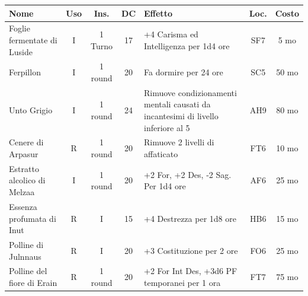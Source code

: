 \noindent\begin{tabularx}{1\textwidth}{lcccXcc}
\textbf{Nome}& \textbf{Uso} & \textbf{Ins.} & \textbf{DC} & \textbf{Effetto}& \textbf{Loc.} & \textbf{Costo} \\
\toprule
Foglie fermentate di Luside\index{Foglie fermentate di Luside}& I& 1 Turno& 17&+4 Carisma ed Intelligenza per 1d4 ore& SF7 & 5 mo\\
\toprule
Ferpillon \index{Ferpillon}& I& 1 round & 20& Fa dormire per 24 ore& SC5 & 50 mo \\
\toprule
Unto Grigio \index{Unto Grigio} & I& 1 round & 24& Rimuove condizionamenti mentali causati da incantesimi di livello inferiore al 5& AH9 & 80 mo\\
\toprule
Cenere di Arpasur \index{Cenere di Arpasur}& R& 1 round & 20& Rimuove 2 livelli di affaticato& FT6 & 10 mo\\
\toprule
Estratto alcolico di Melzaa\index{Estratto alcolico di Melzaa}& I& 1 round & 20& +2 For, +2 Des, -2 Sag. Per 1d4 ore & AF6 & 25 mo \\
\toprule
Essenza profumata di Inut\index{Essenza profumata do Inut} & R& I& 15& +4 Destrezza per 1d8 ore& HB6 & 15 mo \\
\toprule
Polline di Julnnaus\index{Polline di Julnnaus} & R& I& 20& +3 Costituzione per 2 ore & FO6 & 25 mo\\
\toprule
Polline del fiore di Erain \index{Polline del fiore di Erain} & R& 1 round& 20& +2 For Int Des, +3d6 PF temporanei per 1 ora& FT7 & 75 mo\\
\end{tabularx}

